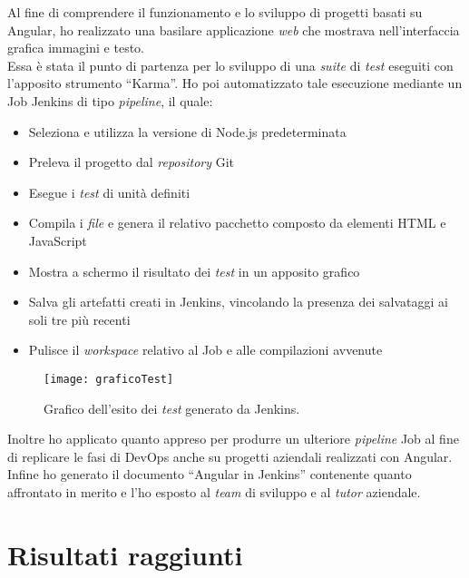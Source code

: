 Al fine di comprendere il funzionamento e lo sviluppo di progetti basati su Angular, ho realizzato una basilare applicazione \emph{web} che mostrava nell'interfaccia grafica immagini e testo.\\
Essa è stata il punto di partenza per lo sviluppo di una \emph{suite} di \emph{test} eseguiti con l'apposito strumento “Karma”. Ho poi automatizzato tale esecuzione mediante un Job Jenkins di tipo \emph{pipeline}, il quale: 
\begin{itemize}
    \item Seleziona e utilizza la versione di Node.js predeterminata
    \item Preleva il progetto dal \emph{repository} Git
    \item Esegue i \emph{test} di unità definiti
    \item Compila i \emph{file} e genera il relativo pacchetto composto da elementi HTML e JavaScript
    \item Mostra a schermo il risultato dei \emph{test} in un apposito grafico
    \item Salva gli artefatti creati in Jenkins, vincolando la presenza dei salvataggi ai soli tre più recenti
    \item Pulisce il \emph{workspace} relativo al Job e alle compilazioni avvenute  
\end{itemize}
\begin{figure}[htbp] 
    \centering 
    \texttt{[image: graficoTest]} 
    \caption{Grafico dell'esito dei \emph{test} generato da Jenkins.}
    \label{fig:graficoTest}
\end{figure}
Inoltre ho applicato quanto appreso per produrre un ulteriore \emph{pipeline} Job al fine di replicare le fasi di \gls{DevOps} anche su progetti aziendali realizzati con Angular.\\
Infine ho generato il documento “Angular in Jenkins” contenente quanto affrontato in merito e l'ho esposto al \emph{team} di sviluppo e al \emph{\emph{tutor}} aziendale. 



\section{Risultati raggiunti}%
